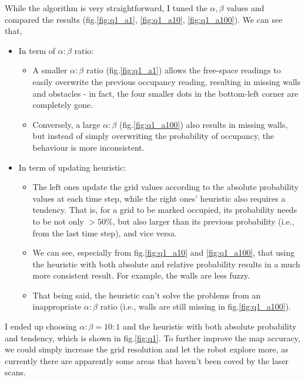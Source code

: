 \documentclass{article} %
\begin{document}
While the algorithm is very straightforward, I tuned the $\alpha, \beta$ values and compared the results (fig.\ref{fig:q1_a1}, \ref{fig:q1_a10}, \ref{fig:q1_a100}). We can see that,
\begin{itemize}
  \item In term of $\alpha:\beta$ ratio:
  \begin{itemize}
    \item A smaller $\alpha:\beta$ ratio (fig.\ref{fig:q1_a1}) allows the free-space readings to easily overwrite the previous occupancy reading, resulting in missing walls and obstacles - in fact, the four smaller dots in the bottom-left corner are completely gone.
    \item Conversely, a large $\alpha:\beta$ (fig.\ref{fig:q1_a100}) also results in missing walls, but instead of simply overwriting the probability of occupancy, the behaviour is more inconsistent.
  \end{itemize} 
  \item In term of updating heuristic:
  \begin{itemize}
    \item The left ones update the grid values according to the absolute probability values at each time step, while the right ones' heuristic also requires a tendency. That is, for a grid to be marked occupied, its probability needs to be not only $>50\%$, but also larger than its previous probability (i.e., from the last time step), and vice versa.
    \item We can see, especially from fig.\ref{fig:q1_a10} and \ref{fig:q1_a100}, that using the heuristic with both absolute and relative probability results in a much more consistent result. For example, the walls are less fuzzy.
    \item That being said, the heuristic can't solve the problems from an inappropriate $\alpha:\beta$ ratio (i.e., walls are still missing in fig.\ref{fig:q1_a100}).
  \end{itemize}
\end{itemize} 

I ended up choosing $\alpha:\beta=10:1$ and the heuristic with both absolute probability and tendency, which is shown in fig.\ref{fig:q1}. To further improve the map accuracy, we could simply increase the grid resolution and let the robot explore more, as currently there are apparently some areas that haven't been coved by the laser scans.
\end{document}
